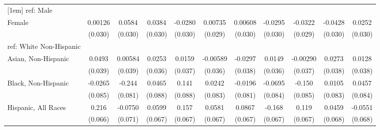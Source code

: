 \begin{table}[htbp]
\begin{tabular}{l*{10}{c}}
[1em]
ref: Male&                     &                     &                     &                     &                     &                     &                     &                     &                     &                     \\
[1em]
Female&     0.00126         &      0.0584\sym{*}  &      0.0384         &     -0.0280         &     0.00735         &     0.00608         &     -0.0295         &     -0.0322         &     -0.0428         &      0.0252         \\
  &     (0.030)         &     (0.030)         &     (0.030)         &     (0.030)         &     (0.029)         &     (0.030)         &     (0.030)         &     (0.029)         &     (0.030)         &     (0.030)         \\
[1em]
ref: White Non-Hispanic&                     &                     &                     &                     &                     &                     &                     &                     &                     &                     \\
[1em]
Asian, Non-Hispanic&      0.0493         &     0.00584         &      0.0253         &      0.0159         &    -0.00589         &     -0.0297         &      0.0149         &    -0.00290         &      0.0273         &      0.0128         \\
  &     (0.039)         &     (0.039)         &     (0.036)         &     (0.037)         &     (0.036)         &     (0.038)         &     (0.036)         &     (0.037)         &     (0.038)         &     (0.038)         \\
[1em]
Black, Non-Hispanic&     -0.0265         &      -0.244\sym{***}&      0.0465         &       0.141         &      0.0242         &     -0.0196         &     -0.0695         &      -0.150\sym{*}  &      0.0105         &      0.0457         \\
  &     (0.085)         &     (0.081)         &     (0.088)         &     (0.088)         &     (0.083)         &     (0.081)         &     (0.084)         &     (0.085)         &     (0.083)         &     (0.084)         \\
[1em]
Hispanic, All Races&       0.216\sym{***}&     -0.0750         &      0.0599         &       0.157\sym{**} &      0.0581         &      0.0867         &      -0.168\sym{**} &       0.119\sym{*}  &      0.0459         &     -0.0551         \\
  &     (0.066)         &     (0.071)         &     (0.067)         &     (0.067)         &     (0.067)         &     (0.067)         &     (0.067)         &     (0.067)         &     (0.068)         &     (0.068)         \\

\end{tabular}
\end{table}

